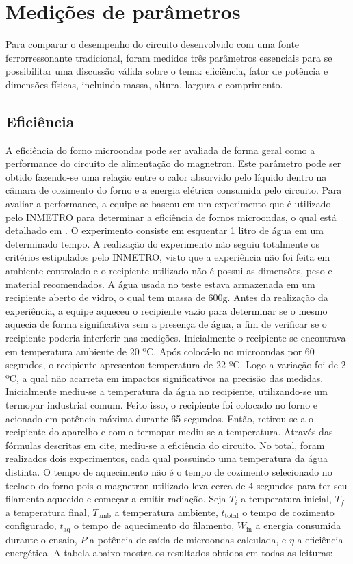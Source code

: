\section{Medições de parâmetros}
\label{sec:mesaures}
Para comparar o desempenho do circuito desenvolvido com uma fonte ferrorressonante tradicional, foram medidos três parâmetros essenciais para se possibilitar uma discussão válida sobre o tema: eficiência, fator de potência e dimensões físicas, incluindo massa, altura, largura e comprimento. 

\subsection{Eficiência}
A eficiência do forno microondas pode ser avaliada de forma geral como a performance do circuito de alimentação do magnetron. Este parâmetro pode ser obtido fazendo-se uma relação entre o calor absorvido pelo líquido dentro na câmara de cozimento do forno e a energia elétrica consumida pelo circuito.
Para avaliar a performance, a equipe se baseou em um experimento que é utilizado pelo INMETRO para determinar a eficiência de fornos microondas, o qual está detalhado em \cite{Inmetro}. O experimento consiste em esquentar 1 litro de água em um determinado tempo. A realização do experimento não seguiu totalmente os critérios estipulados pelo INMETRO, visto que a experiência não foi feita em ambiente controlado e o recipiente utilizado não é possui as dimensões, peso e material recomendados. A água usada no teste estava armazenada em um recipiente aberto de vidro, o qual tem massa de 600g. Antes da realização da experiência, a equipe aqueceu o recipiente vazio para determinar se o mesmo aquecia de forma significativa sem a presença de água, a fim de verificar se o recipiente poderia interferir nas medições. Inicialmente o recipiente se encontrava em temperatura ambiente de 20 ºC. Após colocá-lo no microondas por 60 segundos, o recipiente apresentou temperatura de 22 ºC. Logo a variação foi de 2 ºC, a qual não acarreta em impactos significativos na precisão das medidas.
Inicialmente mediu-se a temperatura da água no recipiente, utilizando-se um termopar industrial comum. Feito isso, o recipiente foi colocado no forno e acionado em potência máxima durante 65 segundos. Então, retirou-se a o recipiente do aparelho e com o termopar mediu-se a temperatura. Através das fórmulas descritas em cite, mediu-se a eficiência do circuito. No total, foram realizados dois experimentos, cada qual possuindo uma temperatura da água distinta. O tempo de aquecimento não é o tempo de cozimento selecionado no teclado do forno pois o magnetron utilizado leva cerca de 4 segundos para ter seu filamento aquecido e começar a emitir radiação. Seja $T_i$ a temperatura inicial, $T_f$ a temperatura final, $T_\mathrm{amb}$ a temperatura ambiente, $t_\mathrm{total}$ o tempo de cozimento configurado, $t_\mathrm{aq}$  o tempo de aquecimento do filamento,  $W_\mathrm{in}$ a energia consumida durante o ensaio, $P$ a potência de saída de microondas calculada, e $\eta$ a eficiência energética. A tabela abaixo mostra os resultados obtidos em todas as leituras:
